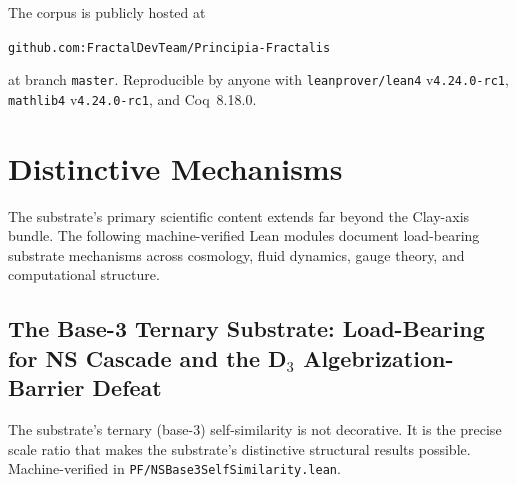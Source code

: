 \documentclass[11pt,a4paper]{amsart}
\theoremstyle{plain}
\theoremstyle{definition}
\begin{document}
The corpus is publicly hosted at
\begin{center}
\texttt{github.com:FractalDevTeam/Principia-Fractalis}
\end{center}
at branch \texttt{master}. Reproducible by anyone with \texttt{leanprover/lean4} v\texttt{4.24.0-rc1}, \texttt{mathlib4} v\texttt{4.24.0-rc1}, and Coq~8.18.0.

\section{Distinctive Mechanisms}\label{sec:distinctive-mechanisms}

The substrate's primary scientific content extends far beyond the Clay-axis bundle. The following machine-verified Lean modules document load-bearing substrate mechanisms across cosmology, fluid dynamics, gauge theory, and computational structure.

\subsection{The Base-3 Ternary Substrate: Load-Bearing for NS Cascade and the D\texorpdfstring{$_3$}{3} Algebrization-Barrier Defeat}\label{subsec:base3-ternary}

The substrate's ternary (base-3) self-similarity is not decorative. It is the precise scale ratio that makes the substrate's distinctive structural results possible. Machine-verified in \texttt{PF/NSBase3SelfSimilarity.lean}.
\end{document}
